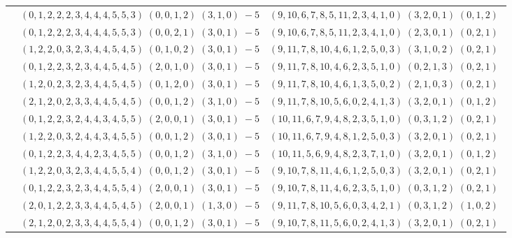 \documentclass[11pt]{article}
\begin{document}
\begin{longtable}[l]{|c|c|c|}
 \cline{2-3} 
 & $(0 ,1 ,2 ,2 ,2 ,3 ,4 ,4 ,4 ,5 ,5 ,3) \;(0 ,0 ,1 ,2) \;(3 ,1 ,0) \;-5$ & $(9 ,10 ,6 ,7 ,8 ,5 ,11 ,2 ,3 ,4 ,1 ,0) \;(3 ,2 ,0 ,1) \;(0 ,1 ,2) \;$\\ 
 \cline{2-3} 
 & $(0 ,1 ,2 ,2 ,2 ,3 ,4 ,4 ,4 ,5 ,5 ,3) \;(0 ,0 ,2 ,1) \;(3 ,0 ,1) \;-5$ & $(9 ,10 ,6 ,7 ,8 ,5 ,11 ,2 ,3 ,4 ,1 ,0) \;(2 ,3 ,0 ,1) \;(0 ,2 ,1) \;$\\ 
 \cline{2-3} 
 & $(1 ,2 ,2 ,0 ,3 ,2 ,3 ,4 ,4 ,5 ,4 ,5) \;(0 ,1 ,0 ,2) \;(3 ,0 ,1) \;-5$ & $(9 ,11 ,7 ,8 ,10 ,4 ,6 ,1 ,2 ,5 ,0 ,3) \;(3 ,1 ,0 ,2) \;(0 ,2 ,1) \;$\\ 
 \cline{2-3} 
 & $(0 ,1 ,2 ,2 ,3 ,2 ,3 ,4 ,4 ,5 ,4 ,5) \;(2 ,0 ,1 ,0) \;(3 ,0 ,1) \;-5$ & $(9 ,11 ,7 ,8 ,10 ,4 ,6 ,2 ,3 ,5 ,1 ,0) \;(0 ,2 ,1 ,3) \;(0 ,2 ,1) \;$\\ 
 \cline{2-3} 
 & $(1 ,2 ,0 ,2 ,3 ,2 ,3 ,4 ,4 ,5 ,4 ,5) \;(0 ,1 ,2 ,0) \;(3 ,0 ,1) \;-5$ & $(9 ,11 ,7 ,8 ,10 ,4 ,6 ,1 ,3 ,5 ,0 ,2) \;(2 ,1 ,0 ,3) \;(0 ,2 ,1) \;$\\ 
 \cline{2-3} 
 & $(2 ,1 ,2 ,0 ,2 ,3 ,3 ,4 ,4 ,5 ,4 ,5) \;(0 ,0 ,1 ,2) \;(3 ,1 ,0) \;-5$ & $(9 ,11 ,7 ,8 ,10 ,5 ,6 ,0 ,2 ,4 ,1 ,3) \;(3 ,2 ,0 ,1) \;(0 ,1 ,2) \;$\\ 
 \cline{2-3} 
 & $(0 ,1 ,2 ,2 ,3 ,2 ,4 ,4 ,3 ,4 ,5 ,5) \;(2 ,0 ,0 ,1) \;(3 ,0 ,1) \;-5$ & $(10 ,11 ,6 ,7 ,9 ,4 ,8 ,2 ,3 ,5 ,1 ,0) \;(0 ,3 ,1 ,2) \;(0 ,2 ,1) \;$\\ 
 \cline{2-3} 
 & $(1 ,2 ,2 ,0 ,3 ,2 ,4 ,4 ,3 ,4 ,5 ,5) \;(0 ,0 ,1 ,2) \;(3 ,0 ,1) \;-5$ & $(10 ,11 ,6 ,7 ,9 ,4 ,8 ,1 ,2 ,5 ,0 ,3) \;(3 ,2 ,0 ,1) \;(0 ,2 ,1) \;$\\ 
 \cline{2-3} 
 & $(0 ,1 ,2 ,2 ,3 ,4 ,4 ,2 ,3 ,4 ,5 ,5) \;(0 ,0 ,1 ,2) \;(3 ,1 ,0) \;-5$ & $(10 ,11 ,5 ,6 ,9 ,4 ,8 ,2 ,3 ,7 ,1 ,0) \;(3 ,2 ,0 ,1) \;(0 ,1 ,2) \;$\\ 
 \cline{2-3} 
 & $(1 ,2 ,2 ,0 ,3 ,2 ,3 ,4 ,4 ,5 ,5 ,4) \;(0 ,0 ,1 ,2) \;(3 ,0 ,1) \;-5$ & $(9 ,10 ,7 ,8 ,11 ,4 ,6 ,1 ,2 ,5 ,0 ,3) \;(3 ,2 ,0 ,1) \;(0 ,2 ,1) \;$\\ 
 \cline{2-3} 
 & $(0 ,1 ,2 ,2 ,3 ,2 ,3 ,4 ,4 ,5 ,5 ,4) \;(2 ,0 ,0 ,1) \;(3 ,0 ,1) \;-5$ & $(9 ,10 ,7 ,8 ,11 ,4 ,6 ,2 ,3 ,5 ,1 ,0) \;(0 ,3 ,1 ,2) \;(0 ,2 ,1) \;$\\ 
 \cline{2-3} 
 & $(2 ,0 ,1 ,2 ,2 ,3 ,3 ,4 ,4 ,5 ,4 ,5) \;(2 ,0 ,0 ,1) \;(1 ,3 ,0) \;-5$ & $(9 ,11 ,7 ,8 ,10 ,5 ,6 ,0 ,3 ,4 ,2 ,1) \;(0 ,3 ,1 ,2) \;(1 ,0 ,2) \;$\\ 
 \cline{2-3} 
 & $(2 ,1 ,2 ,0 ,2 ,3 ,3 ,4 ,4 ,5 ,5 ,4) \;(0 ,0 ,1 ,2) \;(3 ,0 ,1) \;-5$ & $(9 ,10 ,7 ,8 ,11 ,5 ,6 ,0 ,2 ,4 ,1 ,3) \;(3 ,2 ,0 ,1) \;(0 ,2 ,1) \;$\\ 

\end{longtable}
\end{document}
